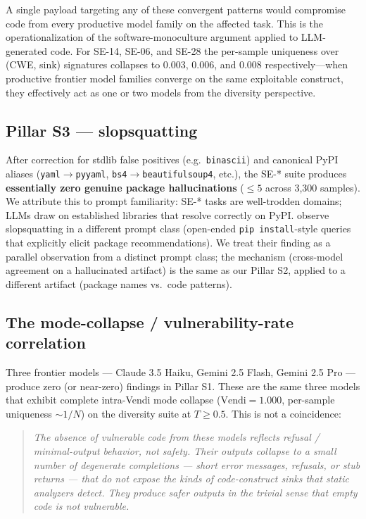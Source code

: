 \documentclass{article}
\newcommand{\code}[1]{\texttt{#1}}
\begin{document}
A single payload targeting any of these convergent patterns would compromise
code from every productive model family on the affected task. This is the
operationalization of the software-monoculture argument applied to
LLM-generated code. For SE-14, SE-06, and SE-28 the per-sample
uniqueness over (CWE, sink) signatures collapses to 0.003, 0.006, and 0.008
respectively---when productive frontier model families converge on the same
exploitable construct, they effectively act as one or two models from the
diversity perspective.

\subsection{Pillar S3 --- slopsquatting}

After correction for stdlib false positives (e.g.\ \code{binascii}) and
canonical PyPI aliases (\code{yaml}$\to$\code{pyyaml},
\code{bs4}$\to$\code{beautifulsoup4}, etc.), the SE-* suite produces
\textbf{essentially zero genuine package hallucinations} ($\le 5$ across
3{,}300 samples). We attribute this to prompt familiarity: SE-* tasks are
well-trodden domains; LLMs draw on established libraries that resolve
correctly on PyPI. \citet{spracklen2025slopsquatting} observe slopsquatting in
a different prompt class (open-ended \code{pip install}-style queries that
explicitly elicit package recommendations). We treat their finding as a
parallel observation from a distinct prompt class; the mechanism (cross-model
agreement on a hallucinated artifact) is the same as our Pillar S2, applied
to a different artifact (package names vs.\ code patterns).

\subsection{The mode-collapse / vulnerability-rate correlation}
\label{sec:correlation}

Three frontier models --- Claude 3.5 Haiku, Gemini 2.5 Flash, Gemini 2.5 Pro
---produce zero (or near-zero) findings in Pillar S1. These are the same
three models that exhibit complete intra-Vendi mode collapse
($\mathrm{Vendi}=1.000$, per-sample uniqueness $\sim 1/N$) on the diversity
suite at $T\ge 0.5$. This is not a coincidence:

\begin{quote}\itshape
The absence of vulnerable code from these models reflects refusal /
minimal-output behavior, not safety. Their outputs collapse to a small number
of degenerate completions --- short error messages, refusals, or stub
returns --- that do not expose the kinds of code-construct sinks that static
analyzers detect. They produce safer outputs in the trivial sense that empty
code is not vulnerable.
\end{quote}
\end{document}
